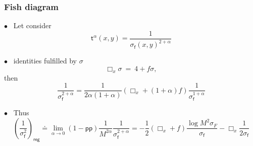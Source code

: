 \documentclass[9pt]{beamer}
\newcommand{\backupend}{
    \addtocounter{framenumberappendix}{-\value{framenumber}}
    \addtocounter{framenumber}{\value{framenumberappendix}} 
  }
\newcommand{\pp}{\mathsf{pp}} %
\newcommand{\fsf}{\mathsf{f}}
\newcommand{\tsf}{\mathsf{t}}
\begin{document}

\begin{frame}[label=details_fish]

\frametitle{Fish diagram}
 
$\bullet$ \ Let consider 
\begin{equation*}
\tsf^\alpha(x,y) = \frac{1}{\sigma_\fsf(x,y)^{2+\alpha}} 
\end{equation*}


$\bullet$ \ identities fulfilled by $\sigma$
\begin{equation*}
\Box_x \sigma \ = \ 4 + f \sigma, %
\end{equation*}
\hspace*{10pt} then
\begin{equation*}
\frac{1}{\sigma_\fsf^{2+\alpha}}=\frac{1}{2\alpha(1+\alpha)}\left(\Box_x+(1+\alpha)f\right)\frac{1}{\sigma_\fsf^{1+\alpha}} 
\end{equation*}
 

$\bullet$ \ Thus
\begin{equation*}
\left(\frac{1}{\sigma_\fsf^2}\right)_\mathsf{reg} \doteq \lim_{\alpha\to 0}\left(1-\pp\right)\frac{1}{M^{2\alpha}}\frac{1}{\sigma_\fsf^{2+\alpha}}=-\frac{1}{2}(\Box_x+f)\frac{\log M^2 \sigma_F}{\sigma_\fsf}-\Box_x \frac{1}{2\sigma_\fsf} 
\end{equation*}


\hfill \hyperlink{fish}{}
\end{frame}



 




 


\backupend

\end{document}
